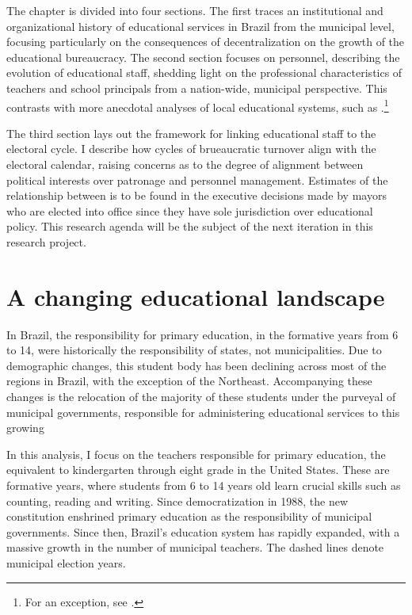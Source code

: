 \documentclass[12pt,]{book}
\let\rmarkdownfootnote\footnote%
\def\footnote{\protect\rmarkdownfootnote}
\begin{document}
The chapter is divided into four sections. The first traces an institutional and organizational history of educational services in Brazil from the municipal level, focusing particularly on the consequences of decentralization on the growth of the educational bureaucracy. The second section focuses on personnel, describing the evolution of educational staff, shedding light on the professional characteristics of teachers and school principals from a nation-wide, municipal perspective. This contrasts with more anecdotal analyses of local educational systems, such as \citet{abrucio_gestao_2010}.\footnote{For an exception, see \citet{gatti_professores_2009}.}

The third section lays out the framework for linking educational staff to the electoral cycle. I describe how cycles of brueaucratic turnover align with the electoral calendar, raising concerns as to the degree of alignment between political interests over patronage and personnel management. Estimates of the relationship between is to be found in the executive decisions made by mayors who are elected into office since they have sole jurisdiction over educational policy. This research agenda will be the subject of the next iteration in this research project.

\hypertarget{a-changing-educational-landscape}{%
\section{A changing educational landscape}\label{a-changing-educational-landscape}}

In Brazil, the responsibility for primary education, in the formative years from 6 to 14, were historically the responsibility of states, not municipalities. Due to demographic changes, this student body has been declining across most of the regions in Brazil, with the exception of the Northeast. Accompanying these changes is the relocation of the majority of these students under the purveyal of municipal governments, responsible for administering educational services to this growing

In this analysis, I focus on the teachers responsible for primary education, the equivalent to kindergarten through eight grade in the United States. These are formative years, where students from 6 to 14 years old learn crucial skills such as counting, reading and writing. Since democratization in 1988, the new constitution enshrined primary education as the responsibility of municipal governments. Since then, Brazil's education system has rapidly expanded, with a massive growth in the number of municipal teachers. The dashed lines denote municipal election years.
\end{document}
